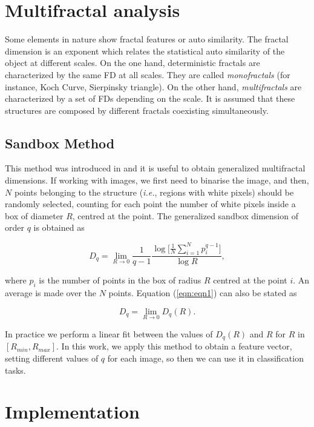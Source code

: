 \documentclass[oneside,a4paper,english,links]{article}
\begin{document}
\section{Multifractal analysis}
Some elements in nature show fractal features or auto similarity. The fractal dimension is an exponent which relates the statistical auto similarity of the object at different scales. On the one hand, deterministic fractals are characterized by the same FD at all scales. They are called {\em monofractals} (for instance, Koch Curve, Sierpinsky triangle). On the other hand, {\em multifractals} \cite{Mandelbrot89} are characterized by a set of FDs depending on the scale. It is assumed that these structures are composed by different fractals coexisting simultaneously.

\subsection{Sandbox Method}
This method was introduced in \cite{Tel89} and it is useful to obtain generalized multifractal dimensions. If working with images, we first need to binarise the image, and then, $N$ points belonging to the structure ({\em i.e.}, regions with white pixels) should be randomly selected, counting for each point the number of white pixels inside a box of diameter $R$, centred at the point. The generalized sandbox dimension of order $q$ is obtained as \cite{Bert94}

\begin{equation}
D_{q} = \lim_{R\rightarrow0}{\frac{1}{q-1} \frac{\log \bigg \lbrack\frac{1}{N}\displaystyle \sum_{i=1}^{N}{p_{i}^{q-1}}\bigg \rbrack}{\log R}},
\label{eqn:eqn1}
\end{equation}

where $p_{i}$ is the number of points in the box of radius $R$ centred at the point $i$. An average is made over the $N$ points. Equation (\ref{eqn:eqn1}) can also be stated as

\begin{equation}
D_{q} = \lim_{R\rightarrow0}{D_{q}(R)}.
\end{equation}

In practice we perform a linear fit between the values of $D_{q}(R)$ and $R$ for $R$ in $[R_{min}, R_{max}]$. In this work, we apply this method to obtain a feature vector, setting different values of $q$ for each image, so then we can use it in classification tasks.

\section{Implementation}
\end{document}
